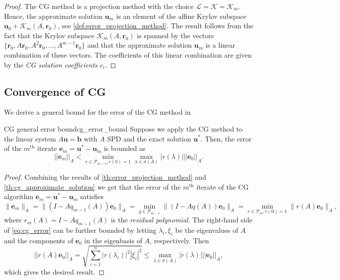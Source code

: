 \begin{proof}
  The CG method is a projection method with the choice $\mathcal{L} = \mathcal{K} = \mathcal{K}_m$. Hence, the approximate solution $\mathbf{u}_m$ is an element of the affine Krylov subspace $\mathbf{u}_0 + \mathcal{K}_m(A, \mathbf{r}_0)$, see \cref{def:error_projection_method}. The result follows from the fact that the Krylov subspace $\mathcal{K}_m(A, \mathbf{r}_0)$ is spanned by the vectors $\{\mathbf{r}_0, A\mathbf{r}_0, A^2\mathbf{r}_0, \dots, A^{m-1}\mathbf{r}_0\}$ and that the approximate solution $\mathbf{u}_m$ is a linear combination of these vectors. The coefficients of this linear combination are given by the \textit{CG solution coefficients} $c_i$.
\end{proof}

\subsection{Convergence of CG}\label{sec:cg_convergence}
We derive a general bound for the error of the CG method in
\begin{fancyth}{CG general error bound}{cg_error_bound}
  Suppose we apply the CG method to the linear system $A\mathbf{u} = \mathbf{b}$ with $A$ SPD and the exact solution $\mathbf{u}^*$. Then, the error of the $m^{\text{th}}$ iterate $\mathbf{e}_m = \mathbf{u}^* - \mathbf{u}_m$ is bounded as
  \begin{equation}
    ||\mathbf{e}_m||_A < \min_{r \in \mathcal{P}_{m-1}, r(0) = 1} \max_{\lambda \in \sigma(A)} |r(\lambda)| ||\mathbf{e}_0||_A.
    \label{eq:cg_error_bound}
  \end{equation}
\end{fancyth}
\begin{proof}
  Combining the results of \cref{th:error_projection_method} and \cref{th:cg_approximate_solution} we get that the error of the $m^{\text{th}}$ iterate of the CG algorithm $\mathbf{e}_m = \mathbf{u}^* - \mathbf{u}_m$ satisfies
  \begin{equation}
    \|\mathbf{e}_m\|_A = \|(I - Aq_{m-1}(A))\mathbf{e}_0\|_A = \min_{q \in \mathcal{P}_{m-1}}\|(I - Aq(A))\mathbf{e}_0\|_A = \min_{r \in \mathcal{P}_{m}, r(0) = 1}\|r(A)\mathbf{e}_0\|_A,
    \label{eq:cg_error}
  \end{equation}
  where $r_m(A) = I - Aq_{m-1}(A)$ is the \textit{residual polynomial}. The right-hand side of \cref{eq:cg_error} can be further bounded by letting $\lambda_i, \xi_i$ be the eigenvalues of $A$ and the components of $\mathbf{e}_0$ in the eigenbasis of $A$, respectively. Then
  \[
    ||r(A)\mathbf{e}_0||_A = \sqrt{\sum_{i=1}^n |r(\lambda_i)|^2 |\xi_i|^2} \leq \max_{\lambda \in \sigma(A)} |r(\lambda)| ||\mathbf{e}_0||_A,
  \]
  which gives the desired result.
\end{proof}

